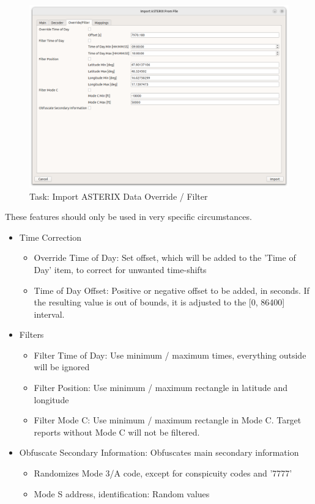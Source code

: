 \begin{figure}[H]
  \center
    \hspace*{-0.5cm}
    \includegraphics[width=17cm]{figures/asterix_import_data_override.png}
  \caption{Task: Import ASTERIX Data Override / Filter}
\end{figure}

These features should only be used in very specific circumstances.

\begin{itemize}
\item Time Correction
\begin{itemize}
\item Override Time of Day: Set offset, which will be added to the 'Time of Day'  item, to correct for unwanted time-shifts
\item Time of Day Offset: Positive or negative offset to be added, in seconds. If the resulting value is out of bounds, it is adjusted to the [0, 86400] interval.
\end{itemize}
\item Filters
\begin{itemize}
\item Filter Time of Day: Use minimum / maximum times, everything outside will be ignored
\item Filter Position: Use minimum / maximum rectangle in latitude and longitude
\item Filter Mode C: Use minimum / maximum rectangle in Mode C. Target reports without Mode C will not be filtered.
\end{itemize}
\item Obfuscate Secondary Information: Obfuscates main secondary information
\begin{itemize}
\item Randomizes Mode 3/A code, except for conspicuity codes and '7777'
\item Mode S address, identification: Random values
\end{itemize}
\end{itemize}
\ \\

